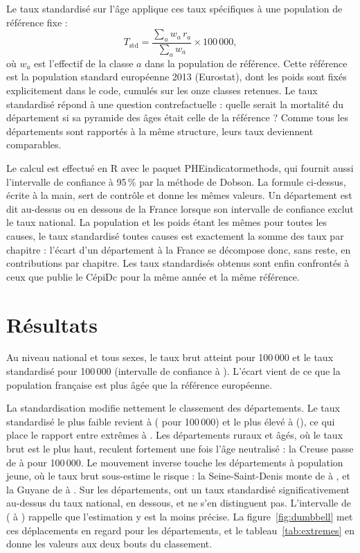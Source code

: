 \documentclass[11pt,a4paper]{article}
\begin{document}
Le taux standardisé sur l'âge applique ces taux spécifiques à une population de
référence fixe :
\[
T_{\text{std}} = \frac{\sum_a w_a \, r_a}{\sum_a w_a} \times 100\,000 ,
\]
où $w_a$ est l'effectif de la classe $a$ dans la population de référence. Cette
référence est la population standard européenne 2013 (Eurostat), dont les poids
sont fixés explicitement dans le code, cumulés sur les onze classes retenues.
Le taux standardisé répond à une question contrefactuelle : quelle serait la
mortalité du département si sa pyramide des âges était celle de la référence ?
Comme tous les départements sont rapportés à la même structure, leurs taux
deviennent comparables.

Le calcul est effectué en R avec le paquet PHEindicatormethods, qui fournit
aussi l'intervalle de confiance à 95\,\% par la méthode de Dobson. La formule
ci-dessus, écrite à la main, sert de contrôle et donne les mêmes valeurs. Un
département est dit au-dessus ou en dessous de la France lorsque son intervalle
de confiance exclut le taux national. La population et les poids étant les mêmes
pour toutes les causes, le taux standardisé toutes causes est exactement la somme
des taux par chapitre : l'écart d'un département à la France se décompose donc,
sans reste, en contributions par chapitre. Les taux standardisés obtenus sont
enfin confrontés à ceux que publie le CépiDc pour la même année et la même
référence.

\section{Résultats}
Au niveau national et tous sexes, le taux brut atteint \frBrut{} pour 100\,000 et
le taux standardisé \frStd{} pour 100\,000 (intervalle de confiance \frIcBas{} à
\frIcHaut). L'écart vient de ce que la population française est plus âgée que la
référence européenne.

La standardisation modifie nettement le classement des départements. Le taux
standardisé le plus faible revient à \basNom{} (\basStd{} pour 100\,000) et le
plus élevé à \hautNom{} (\hautStd), ce qui place le rapport entre extrêmes à
\rapportExtremes. Les départements ruraux et âgés, où le taux brut est le plus
haut, reculent fortement une fois l'âge neutralisé : la Creuse passe de
\creuseBrut{} à \creuseStd{} pour 100\,000. Le mouvement inverse touche les
départements à population jeune, où le taux brut sous-estime le risque : la
Seine-Saint-Denis monte de \seineBrut{} à \seineStd, et la Guyane de
\guyaneBrut{} à \guyaneStd. Sur les \nDep{} départements, \nAuDessus{} ont un taux
standardisé significativement au-dessus du taux national, \nEnDessous{} en
dessous, et \nNonDistinct{} ne s'en distinguent pas. L'intervalle de \hautNom{}
(\hautIcBas{} à \hautIcHaut) rappelle que l'estimation y est la moins précise. La
figure~\ref{fig:dumbbell} met ces déplacements en regard pour les \nDep{}
départements, et le tableau~\ref{tab:extremes} en donne les valeurs aux deux
bouts du classement.
\end{document}
